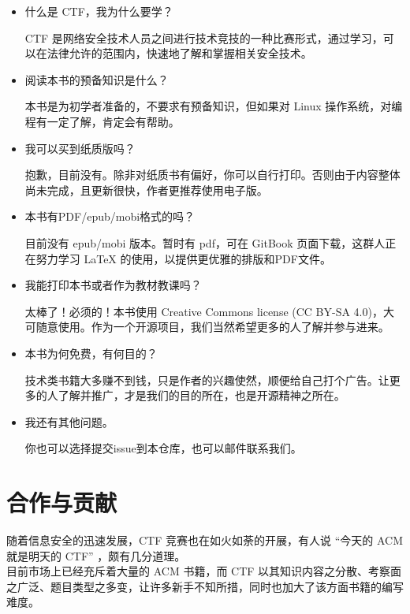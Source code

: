 \begin{itemize}\setlength{\parindent}{2em}
    \item 什么是 CTF，我为什么要学？
    
    CTF 是网络安全技术人员之间进行技术竞技的一种比赛形式，通过学习，可以在法律允许的范围内，快速地了解和掌握相关安全技术。

    \item 阅读本书的预备知识是什么？
    
    本书是为初学者准备的，不要求有预备知识，但如果对 Linux 操作系统，对编程有一定了解，肯定会有帮助。

    \item 我可以买到纸质版吗？
    
    抱歉，目前没有。除非对纸质书有偏好，你可以自行打印。否则由于内容整体尚未完成，且更新很快，作者更推荐使用电子版。
    
    \item 本书有PDF/epub/mobi格式的吗？
    
    目前没有 epub/mobi 版本。暂时有 pdf，可在 GitBook 页面下载，这群人正在努力学习 \LaTeX\␣ 的使用，以提供更优雅的排版和PDF文件。
    
    \item 我能打印本书或者作为教材教课吗？
    
    太棒了！必须的！本书使用 Creative Commons license (CC BY-SA 4.0)，大可随意使用。作为一个开源项目，我们当然希望更多的人了解并参与进来。
    
    \item 本书为何免费，有何目的？
    
    技术类书籍大多赚不到钱，只是作者的兴趣使然，顺便给自己打个广告。让更多的人了解并推广，才是我们的目的所在，也是开源精神之所在。
    
    \item 我还有其他问题。
    
    你也可以选择提交issue到本仓库，也可以邮件联系我们。
    
\end{itemize}

\section{合作与贡献}
\indent \setlength{\parindent}{2em}

    \indent 随着信息安全的迅速发展，CTF 竞赛也在如火如荼的开展，有人说 “今天的 ACM 就是明天的 CTF” ，颇有几分道理。
    \\目前市场上已经充斥着大量的 ACM 书籍，而 CTF 以其知识内容之分散、考察面之广泛、题目类型之多变，让许多新手不知所措，同时也加大了该方面书籍的编写难度。

